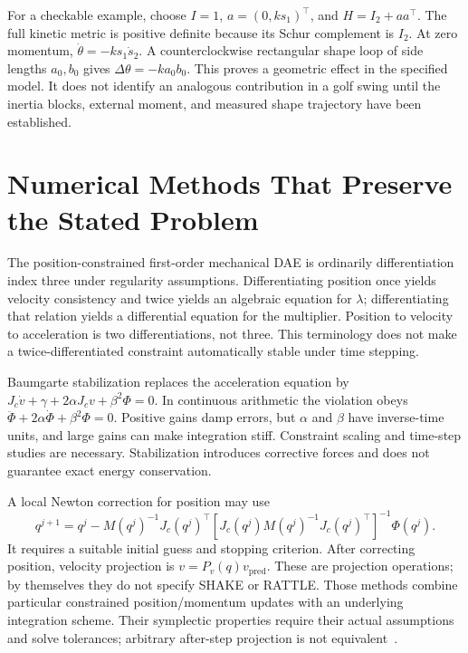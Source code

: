 For a checkable example, choose $I=1$, $a=(0,k s_1)^\top$, and $H=I_2+aa^\top$. The full kinetic metric is positive definite because its Schur complement is $I_2$. At zero momentum, $\dot\theta=-k s_1\dot s_2$. A counterclockwise rectangular shape loop of side lengths $a_0,b_0$ gives $\Delta\theta=-k a_0b_0$. This proves a geometric effect in the specified model. It does not identify an analogous contribution in a golf swing until the inertia blocks, external moment, and measured shape trajectory have been established.

\section{Numerical Methods That Preserve the Stated Problem}
\label{sec:ch9:numerics}

The position-constrained first-order mechanical DAE is ordinarily differentiation index three under regularity assumptions. Differentiating position once yields velocity consistency and twice yields an algebraic equation for $\lambda$; differentiating that relation yields a differential equation for the multiplier. Position to velocity to acceleration is two differentiations, not three. This terminology does not make a twice-differentiated constraint automatically stable under time stepping.

Baumgarte stabilization replaces the acceleration equation by $J_c\dot v+\gamma+2\alpha J_cv+\beta^2\Phi=0$. In continuous arithmetic the violation obeys $\ddot\Phi+2\alpha\dot\Phi+\beta^2\Phi=0$. Positive gains damp errors, but $\alpha$ and $\beta$ have inverse-time units, and large gains can make integration stiff. Constraint scaling and time-step studies are necessary. Stabilization introduces corrective forces and does not guarantee exact energy conservation.

A local Newton correction for position may use
\begin{equation}
 q^{j+1}=q^j-M(q^j)^{-1}J_c(q^j)^\top
 \left[J_c(q^j)M(q^j)^{-1}J_c(q^j)^\top\right]^{-1}\Phi(q^j).
\end{equation}
It requires a suitable initial guess and stopping criterion. After correcting position, velocity projection is $v=P_v(q)v_{\mathrm{pred}}$. These are projection operations; by themselves they do not specify SHAKE or RATTLE. Those methods combine particular constrained position/momentum updates with an underlying integration scheme. Their symplectic properties require their actual assumptions and solve tolerances; arbitrary after-step projection is not equivalent~\cite{HairerLubichWanner2006}.

